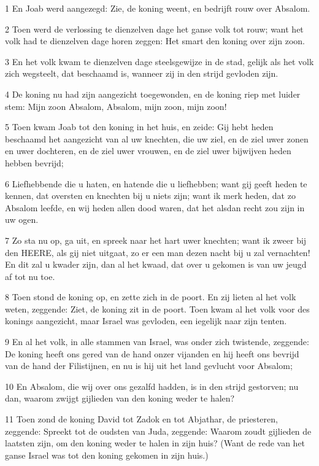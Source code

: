 \par 1 En Joab werd aangezegd: Zie, de koning weent, en bedrijft rouw over Absalom.
\par 2 Toen werd de verlossing te dienzelven dage het ganse volk tot rouw; want het volk had te dienzelven dage horen zeggen: Het smart den koning over zijn zoon.
\par 3 En het volk kwam te dienzelven dage steelsgewijze in de stad, gelijk als het volk zich wegsteelt, dat beschaamd is, wanneer zij in den strijd gevloden zijn.
\par 4 De koning nu had zijn aangezicht toegewonden, en de koning riep met luider stem: Mijn zoon Absalom, Absalom, mijn zoon, mijn zoon!
\par 5 Toen kwam Joab tot den koning in het huis, en zeide: Gij hebt heden beschaamd het aangezicht van al uw knechten, die uw ziel, en de ziel uwer zonen en uwer dochteren, en de ziel uwer vrouwen, en de ziel uwer bijwijven heden hebben bevrijd;
\par 6 Liefhebbende die u haten, en hatende die u liefhebben; want gij geeft heden te kennen, dat oversten en knechten bij u niets zijn; want ik merk heden, dat zo Absalom leefde, en wij heden allen dood waren, dat het alsdan recht zou zijn in uw ogen.
\par 7 Zo sta nu op, ga uit, en spreek naar het hart uwer knechten; want ik zweer bij den HEERE, als gij niet uitgaat, zo er een man dezen nacht bij u zal vernachten! En dit zal u kwader zijn, dan al het kwaad, dat over u gekomen is van uw jeugd af tot nu toe.
\par 8 Toen stond de koning op, en zette zich in de poort. En zij lieten al het volk weten, zeggende: Ziet, de koning zit in de poort. Toen kwam al het volk voor des konings aangezicht, maar Israel was gevloden, een iegelijk naar zijn tenten.
\par 9 En al het volk, in alle stammen van Israel, was onder zich twistende, zeggende: De koning heeft ons gered van de hand onzer vijanden en hij heeft ons bevrijd van de hand der Filistijnen, en nu is hij uit het land gevlucht voor Absalom;
\par 10 En Absalom, die wij over ons gezalfd hadden, is in den strijd gestorven; nu dan, waarom zwijgt gijlieden van den koning weder te halen?
\par 11 Toen zond de koning David tot Zadok en tot Abjathar, de priesteren, zeggende: Spreekt tot de oudsten van Juda, zeggende: Waarom zoudt gijlieden de laatsten zijn, om den koning weder te halen in zijn huis? (Want de rede van het ganse Israel was tot den koning gekomen in zijn huis.)
